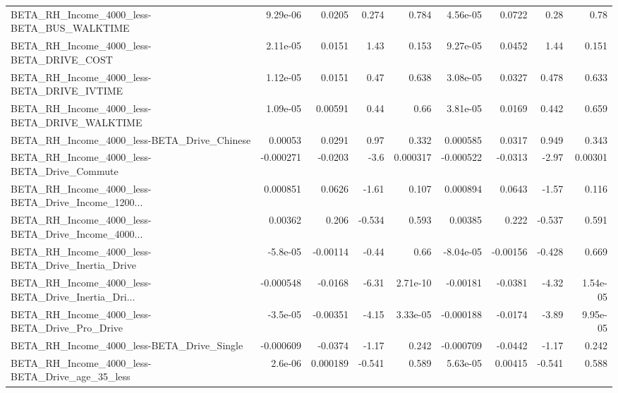 \begin{tabular}{lrrrrrrrr}
BETA\_RH\_Income\_4000\_less-BETA\_BUS\_WALKTIME         &    9.29e-06 &       0.0205 &    0.274 &    0.784 &   4.56e-05 &      0.0722 &         0.28 &          0.78 \\
BETA\_RH\_Income\_4000\_less-BETA\_DRIVE\_COST           &    2.11e-05 &       0.0151 &     1.43 &    0.153 &   9.27e-05 &      0.0452 &         1.44 &         0.151 \\
BETA\_RH\_Income\_4000\_less-BETA\_DRIVE\_IVTIME         &    1.12e-05 &       0.0151 &     0.47 &    0.638 &   3.08e-05 &      0.0327 &        0.478 &         0.633 \\
BETA\_RH\_Income\_4000\_less-BETA\_DRIVE\_WALKTIME       &    1.09e-05 &      0.00591 &     0.44 &     0.66 &   3.81e-05 &      0.0169 &        0.442 &         0.659 \\
BETA\_RH\_Income\_4000\_less-BETA\_Drive\_Chinese        &     0.00053 &       0.0291 &     0.97 &    0.332 &   0.000585 &      0.0317 &        0.949 &         0.343 \\
BETA\_RH\_Income\_4000\_less-BETA\_Drive\_Commute        &   -0.000271 &      -0.0203 &     -3.6 & 0.000317 &  -0.000522 &     -0.0313 &        -2.97 &       0.00301 \\
BETA\_RH\_Income\_4000\_less-BETA\_Drive\_Income\_1200... &    0.000851 &       0.0626 &    -1.61 &    0.107 &   0.000894 &      0.0643 &        -1.57 &         0.116 \\
BETA\_RH\_Income\_4000\_less-BETA\_Drive\_Income\_4000... &     0.00362 &        0.206 &   -0.534 &    0.593 &    0.00385 &       0.222 &       -0.537 &         0.591 \\
BETA\_RH\_Income\_4000\_less-BETA\_Drive\_Inertia\_Drive  &    -5.8e-05 &     -0.00114 &    -0.44 &     0.66 &  -8.04e-05 &    -0.00156 &       -0.428 &         0.669 \\
BETA\_RH\_Income\_4000\_less-BETA\_Drive\_Inertia\_Dri... &   -0.000548 &      -0.0168 &    -6.31 & 2.71e-10 &   -0.00181 &     -0.0381 &        -4.32 &      1.54e-05 \\
BETA\_RH\_Income\_4000\_less-BETA\_Drive\_Pro\_Drive      &    -3.5e-05 &     -0.00351 &    -4.15 & 3.33e-05 &  -0.000188 &     -0.0174 &        -3.89 &      9.95e-05 \\
BETA\_RH\_Income\_4000\_less-BETA\_Drive\_Single         &   -0.000609 &      -0.0374 &    -1.17 &    0.242 &  -0.000709 &     -0.0442 &        -1.17 &         0.242 \\
BETA\_RH\_Income\_4000\_less-BETA\_Drive\_age\_35\_less    &     2.6e-06 &     0.000189 &   -0.541 &    0.589 &   5.63e-05 &     0.00415 &       -0.541 &         0.588 \\

\end{tabular}
